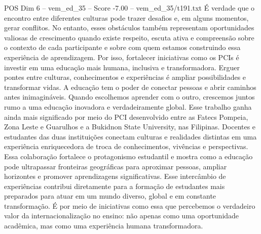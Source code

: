 \begin{textsample}{POS Dim 6 – vem\_ed\_35 – Score -7.00 – vem\_ed\_35/t191.txt}
É verdade que o encontro entre diferentes culturas pode trazer desafios e, em alguns momentos, gerar conflitos.
No entanto, esses obstáculos também representam oportunidades valiosas de crescimento quando existe respeito, escuta ativa e compreensão sobre o contexto de cada participante e sobre com quem estamos construindo essa experiência de aprendizagem.
Por isso, fortalecer iniciativas como os PCIs é investir em uma educação mais humana, inclusiva e transformadora.
Erguer pontes entre culturas, conhecimentos e experiências é ampliar possibilidades e transformar vidas.
A educação tem o poder de conectar pessoas e abrir caminhos antes inimagináveis.
Quando escolhemos aprender com o outro, crescemos juntos rumo a uma educação inovadora e verdadeiramente global.
Esse trabalho ganha ainda mais significado por meio do PCI desenvolvido entre as Fatecs Pompeia, Zona Leste e Guarulhos e a Bukidnon State University, nas Filipinas.
Docentes e estudantes das duas instituições conectam culturas e realidades distintas em uma experiência enriquecedora de troca de conhecimentos, vivências e perspectivas.
Essa colaboração fortalece o protagonismo estudantil e mostra como a educação pode ultrapassar fronteiras geográficas para aproximar pessoas, ampliar horizontes e promover aprendizagens significativas.
Esse intercâmbio de experiências contribui diretamente para a formação de estudantes mais preparados para atuar em um mundo diverso, global e em constante transformação.
É por meio de iniciativas como essa que percebemos o verdadeiro valor da internacionalização no ensino: não apenas como uma oportunidade acadêmica, mas como uma experiência humana transformadora.

\end{textsample}

